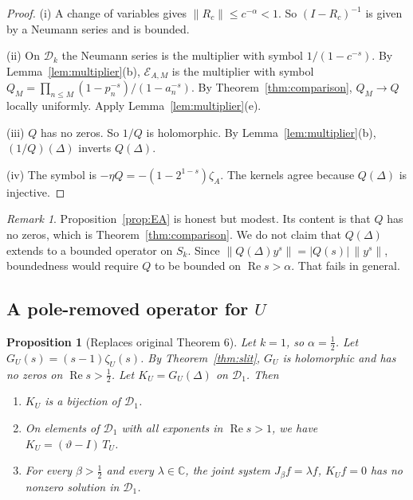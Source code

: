 \documentclass[12pt,letterpaper]{article}
\newtheorem{proposition}[theorem]{Proposition}
\theoremstyle{definition}
\theoremstyle{remark}
\newtheorem{remark}[theorem]{Remark}
\newcommand{\Ree}{\operatorname{Re}}
\newcommand{\CC}{\mathbb{C}}
\newcommand{\Dk}{\mathcal{D}_k}
\newcommand{\yD}{\vartheta}
\begin{document}
\begin{proof}
(i) A change of variables gives $\|R_c\|\le c^{-\alpha}<1$. So
$(I-R_c)^{-1}$ is given by a Neumann series and is bounded.

(ii) On $\Dk$ the Neumann series is the multiplier with symbol
$1/(1-c^{-s})$. By Lemma~\ref{lem:multiplier}(b), $\mathcal E_{A,M}$ is the
multiplier with symbol $Q_M=\prod_{n\le M}(1-p_n^{-s})/(1-a_n^{-s})$. By
Theorem~\ref{thm:comparison}, $Q_M\to Q$ locally uniformly. Apply
Lemma~\ref{lem:multiplier}(e).

(iii) $Q$ has no zeros. So $1/Q$ is holomorphic. By
Lemma~\ref{lem:multiplier}(b), $(1/Q)(\Delta)$ inverts $Q(\Delta)$.

(iv) The symbol is $-\eta Q=-(1-2^{1-s})\zeta_A$. The kernels agree
because $Q(\Delta)$ is injective.
\end{proof}

\begin{remark}
Proposition~\ref{prop:EA} is honest but modest. Its content is that $Q$ has
no zeros, which is Theorem~\ref{thm:comparison}. We do not claim that
$Q(\Delta)$ extends to a bounded operator on $S_k$. Since $\|Q(\Delta)y^s\|
=|Q(s)|\,\|y^s\|$, boundedness would require $Q$ to be bounded on
$\Ree s>\alpha$. That fails in general.
\end{remark}

\subsection{A pole-removed operator for \texorpdfstring{$U$}{U}}

\begin{proposition}[Replaces original Theorem 6]\label{prop:KU}
Let $k=1$, so $\alpha=\frac12$. Let $G_U(s)=(s-1)\zeta_U(s)$. By
Theorem~\ref{thm:slit}, $G_U$ is holomorphic and has no zeros on
$\Ree s>\frac12$. Let $K_U=G_U(\Delta)$ on $\mathcal D_1$. Then
\begin{enumerate}[label=(\roman*)]
\item $K_U$ is a bijection of $\mathcal D_1$.
\item On elements of $\mathcal D_1$ with all exponents in $\Ree s>1$, we
  have $K_U=(\yD-I)\,T_U$.
\item For every $\beta>\frac12$ and every $\lambda\in\CC$, the joint
  system $J_\beta f=\lambda f$, $K_Uf=0$ has no nonzero solution in
  $\mathcal D_1$.
\end{enumerate}
\end{proposition}
\end{document}
